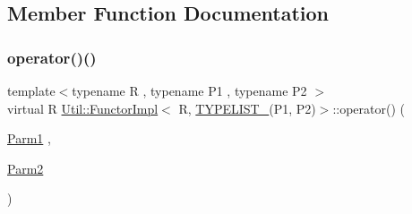 \subsection{Member Function Documentation}
\mbox{\label{classUtil_1_1FunctorImpl_3_01R_00_01TYPELIST__2_07P1_00_01P2_08_4_a5c9378116c2036cb377d239c8d454375}} 
\subsubsection{\texorpdfstring{operator()()}{operator()()}\hspace{0.1cm}{\footnotesize\ttfamily [1/3]}}
{\footnotesize\ttfamily template$<$typename R , typename P1 , typename P2 $>$ \\
virtual R \mbox{\hyperlink{classUtil_1_1FunctorImpl}{Util\+::\+Functor\+Impl}}$<$ R, \mbox{\hyperlink{adat__devel__install_2include_2adat_2typelist_8h_a311cb99af993804c6737ae46c5cbfaff}{T\+Y\+P\+E\+L\+I\+S\+T\+\_}}(P1, P2)$>$\+::operator() (\begin{DoxyParamCaption}\item[{\mbox{\hyperlink{structUtil_1_1Private_1_1FunctorImplBase_a9d61e693d6c616dea5bd9d9073c7d21a}{Parm1}}}]{,  }\item[{\mbox{\hyperlink{structUtil_1_1Private_1_1FunctorImplBase_a554085cd798ef14838a59b528f0feb2e}{Parm2}}}]{ }\end{DoxyParamCaption})\hspace{0.3cm}{\ttfamily [pure virtual]}}

\mbox{\label{classUtil_1_1FunctorImpl_3_01R_00_01TYPELIST__2_07P1_00_01P2_08_4_a5c9378116c2036cb377d239c8d454375}} 
